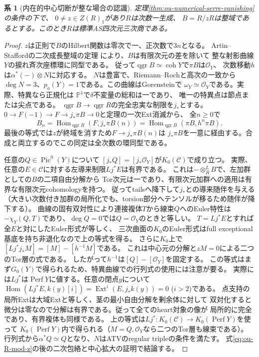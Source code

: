 \documentclass[11pt,a4paper]{ltjsarticle}
\newtheorem{corollary}[theorem]{系}
\theoremstyle{definition}
\newcommand{\qgr}{\operatorname{qgr}}
\newcommand{\coh}{\operatorname{coh}}
\newcommand{\Perf}{\operatorname{Perf}}
\newcommand{\Pic}{\operatorname{Pic}}
\begin{document}
\begin{corollary}[内在的中心切断が整な場合の認識]
\label{cor:ou-integral-central-domain}
定理\ref{thm:ou-numerical-serre-vanishing}の条件の下で、
$0\ne z\in Z(R)_1$があり$R$は次数一生成、
$B=R/zR$は整域であるとする。このとき$R$は標準AS四次元三次商である。
\end{corollary}
\begin{proof}
$z$は正則で$B$のHilbert関数は零次で一、正次数で$3n$となる。
Artin--Staffordの二次成長整域の定理
\cite{AScurves1995}により、$B$は有限次元の差を除いて
整な射影曲線$Y$の捩れ斉次座標環に同型である。
従って$\qgr B\simeq\coh Y$で$\pi B$は$\mathcal O_Y$、
次数移動$h$は$\alpha^*(-)\otimes N$に対応する。
$N$は豊富で、Riemann--Rochと高次の一致から
$\deg N=3$、$p_a(Y)=1$である。この曲線はGorensteinで
$\omega_Y\simeq\mathcal O_Y$である。実際、特異なら正規化は
$\mathbb P^1$で$\delta$不変量の総和は一であり、
唯一の特異点は節点または尖点である。
$\qgr B\to\qgr R$の完全忠実な制限を$j_*$とする。
$0\to F(-1)\to F\to j_*\pi B\to0$と定理の一次Ext消滅から、
全$n\ge0$で
\[
 B_n=\operatorname{Hom}_{\qgr R}(F,j_*\pi B(n))
     =\operatorname{Hom}_{\qgr B}(\pi B,h^n\pi B).
\]
最後の等式では$z$が終域を消すため$F\to j_*\pi B(n)$は
$j_*\pi B$を一意に経由する。合成と両立するのでこの同定は全次数の環同型である。

任意の$Q\in\Pic^0(Y)$について
$[j_*Q]=[j_*\mathcal O_Y]$が$K_0(\mathcal C)$で成り立つ。
実際、任意の$E\in\mathcal C$に対する左導来制限$Lj^*E$は有界である。
これは$-\otimes_R^L B$で、左加群としての$B$の二項自由分解から
Tor次元は一であり、有限次元加群への適用は有界な有限次元cohomologyを持つ。
従ってtailsへ降下して$j_*$との導来随伴を与える
（大きい次数付き加群の局所化でも、torsion部分へテンソルが移るため随伴が降下する）。
曲線の固有双対性により連接複体$T$から線束$Q$へのEuler特性は
$-\chi_Y(Q,T)$であり、$\deg Q=0$では$Q=\mathcal O_Y$のときと等しい。
$T=Lj^*E$とすれば全$E$と対にしたEuler形式が等しく、
三次曲面の$K_0$のEuler形式はfull exceptional基底を持ち非退化なので上の等式を得る。
さらに$K_0$上で$[Lj^*j_*M]=[M]-[h^{-1}M]$である。
これは中心元の分解と$zM=0$による二つのTor層の式である。
したがって$h^{-1}$は$[Q]-[\mathcal O_Y]$を固定する。
この等式はまず$G_0(Y)$で得られるため、特異曲線での行列式の使用には注意が要る。
実際には$Lj^*$は$\Perf Y$に値する。任意の閉点$y$について
$\operatorname{Hom}(Lj^*E,k(y)[i])=\operatorname{Ext}^i(E,j_*k(y))=0$ ($i>2$)である。
点支持の局所Extは大域Extと等しく、茎の最小自由分解を剰余体に対して
双対化すると微分は零なので分解は有界である。従って全てのheart対象の像が
局所的に完全であり、有界複体も同様である。
上の等式は$Lj^*:K_0(\mathcal C)\to K_0(\Perf Y)$を使って
$K_0(\Perf Y)$内で得られる（$M=Q,\mathcal O_Y$なら二つのTor層も線束である）。
行列式から$\alpha^* Q\simeq Q$となり、$N$はATVのregular tripleの条件を満たす。
式\eqref{eq:ou-R-mod-z}の後の二次包絡と中心拡大の証明で結論する。
\end{proof}
\end{document}
